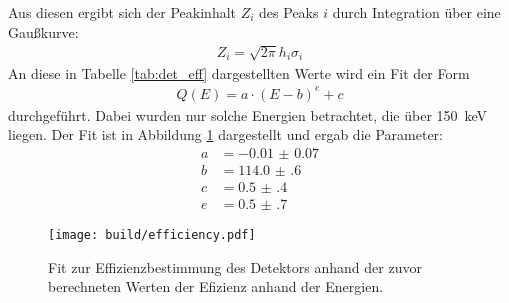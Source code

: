 Aus diesen ergibt sich der Peakinhalt $Z_i$ des Peaks $i$ durch Integration
über eine Gaußkurve:
\begin{align*}
  Z_i = \sqrt{2\pi} h_i \sigma_i
\end{align*}
An diese in Tabelle \ref{tab:det_eff} dargestellten Werte wird ein Fit der Form
\begin{align*}
  Q(E) = a \cdot (E - b)^e + c
\end{align*}
durchgeführt. Dabei wurden nur solche Energien betrachtet, die über
\SI{150}{\kilo\electronvolt} liegen.
Der Fit ist in Abbildung \ref{plt:eff} dargestellt und ergab die Parameter:
\begin{align*}
  a &= -\num{0.01(7)} \\
  b &= \num{114.0(6)} \\
  c &= \num{0.5(4)} \\
  e &= \num{0.5(7)}
\end{align*}
\begin{figure}[htb]
  \centering
  \texttt{[image: build/efficiency.pdf]}
  \caption{Fit zur Effizienzbestimmung des Detektors anhand der zuvor
  berechneten Werten der Efizienz anhand der Energien.}
  \label{plt:eff}
\end{figure}



